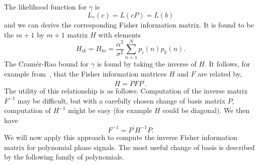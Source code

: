 \documentclass[review]{elsarticle}
\newcommand{\reals}{{\mathbb R}}
\newcommand{\expect}{{\mathbb E}}
\newtheorem{property}{Property}
\begin{document}
The likelihood function for $\gamma$ is 
\[
L_\gamma(c) = L(cP) = L(b)
\] 
and we can derive the corresponding Fisher information matrix.  It is found to be the $m+1$ by $m+1$ matrix $H$ with elements
\[
H_{ik} = H_{ki} = \frac{\alpha^2}{\sigma^2}\sum_{n=1}^{N} p_{i}(n) p_{k}(n).
\]
The Cram\'{e}r-Rao bound for $\gamma$ is found by taking the inverse of $H$.  It follows, for example from~\cite[Sec. 3.8]{Kay1993_stat_sig_est_theory}, that the Fisher information matrices $H$ and $F$ are related by,
\[
H = P F P^\prime.
\]
The utility of this relationship is as follows:  Computation of the inverse matrix $F^{-1}$ may be difficult, but with a carefully chosen change of basis matrix $P$, computation of $H^{-1}$ might be easy (for example $H$ could be diagonal).  We then have
\[
F^{-1} = P^\prime H^{-1} P.
\]  
We will now apply this approach to compute the inverse Fisher information matrix for polynomial phase signals.  The most useful change of basis is described by the following family of polynomials.


\end{document}
